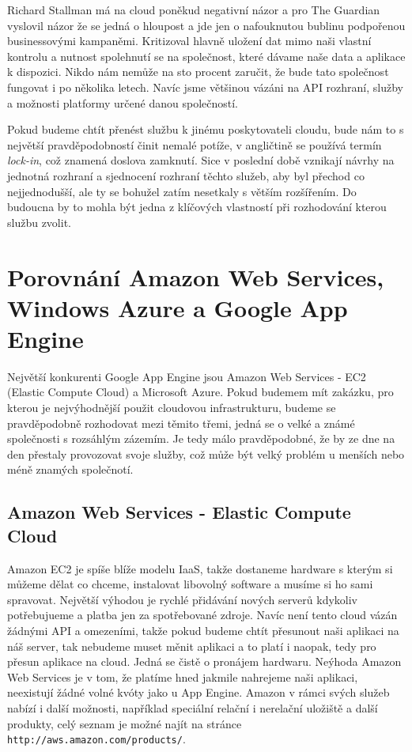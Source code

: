 Richard Stallman má na cloud poněkud negativní názor a pro The Guardian vyslovil názor že se jedná o hloupost a jde jen o nafouknutou bublinu podpořenou businessovými kampaněmi. Kritizoval hlavně uložení dat mimo naši vlastní kontrolu a nutnost spolehnutí se na společnost, které dávame naše data a aplikace k dispozici. Nikdo nám nemůže na sto procent zaručit, že bude tato společnost fungovat i po několika letech. Navíc jsme většinou vázáni na API rozhraní, služby a možnosti platformy určené danou společností.

Pokud budeme chtít přenést službu k jinému poskytovateli cloudu, bude nám to s největší pravděpodobností činit nemalé potíže, v angličtině se používá termín \emph{lock-in}, což znamená doslova zamknutí. Sice v poslední době vznikají návrhy na jednotná rozhraní a sjednocení rozhraní těchto služeb, aby byl přechod co nejjednodušší, ale ty se bohužel zatím nesetkaly s větším rozšířením. Do budoucna by to mohla být jedna z klíčových vlastností při rozhodování kterou službu zvolit.

\section{Porovnání Amazon Web Services, Windows Azure a Google App Engine}
Největší konkurenti Google App Engine jsou Amazon Web Services - EC2 (Elastic Compute Cloud) a Microsoft Azure. Pokud budemem mít zakázku, pro kterou je nejvýhodnější použit cloudovou infrastrukturu, budeme se pravděpodobně rozhodovat mezi těmito třemi, jedná se o velké a známé společnosti s rozsáhlým zázemím. Je tedy málo pravděpodobné, že by ze dne na den přestaly provozovat svoje služby, což může být velký problém u menších nebo méně znamých společnotí.

\subsection{Amazon Web Services - Elastic Compute Cloud}
Amazon EC2 je spíše blíže modelu IaaS, takže dostaneme hardware s kterým si můžeme dělat co chceme, instalovat libovolný software a musíme si ho sami spravovat. Největší výhodou je rychlé přidávání nových serverů kdykoliv potřebujueme a platba jen za spotřebované zdroje. Navíc není tento cloud vázán žádnými API a omezeními, takže pokud budeme chtít přesunout naši aplikaci na náš server, tak nebudeme muset měnit aplikaci a to platí i naopak, tedy pro přesun aplikace na cloud. Jedná se čistě o pronájem hardwaru. Neýhoda Amazon Web Services je v tom, že platíme hned jakmile nahrejeme naši aplikaci, neexistují žádné volné kvóty jako u App Engine. Amazon v rámci svých služeb nabízí i další možnosti, například speciální relační i nerelační uložiště a další produkty, celý seznam je možné najít na stránce \verb|http://aws.amazon.com/products/|. 

